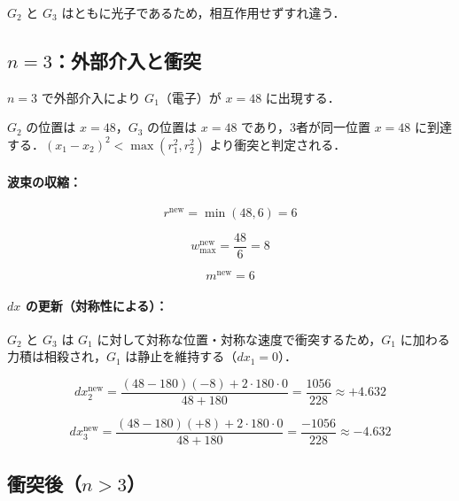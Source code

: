 \documentclass[12pt,a4paper]{ltjsarticle}
\begin{document}
$G_2$ と $G_3$ はともに光子であるため，相互作用せずすれ違う．

\subsection{$n = 3$：外部介入と衝突}

$n = 3$ で外部介入により $G_1$（電子）が $x = 48$ に出現する．

$G_2$ の位置は $x = 48$，$G_3$ の位置は $x = 48$ であり，3者が同一位置 $x = 48$ に到達する．$(x_1 - x_2)^2 < \max(r_1^2, r_2^2)$ より衝突と判定される．

\paragraph{波束の収縮：}

\begin{equation}
r^{\text{new}} = \min(48, 6) = 6
\end{equation}

\begin{equation}
w_{\max}^{\text{new}} = \frac{48}{6} = 8
\end{equation}

\begin{equation}
m^{\text{new}} = 6
\end{equation}

\paragraph{$dx$ の更新（対称性による）：}

$G_2$ と $G_3$ は $G_1$ に対して対称な位置・対称な速度で衝突するため，$G_1$ に加わる力積は相殺され，$G_1$ は静止を維持する（$dx_1 = 0$）．

\begin{equation}
dx_2^{\text{new}} = \frac{(48 - 180)(-8) + 2 \cdot 180 \cdot 0}{48 + 180} = \frac{1056}{228} \approx +4.632
\end{equation}

\begin{equation}
dx_3^{\text{new}} = \frac{(48 - 180)(+8) + 2 \cdot 180 \cdot 0}{48 + 180} = \frac{-1056}{228} \approx -4.632
\end{equation}

\subsection{衝突後（$n > 3$）}
\end{document}
